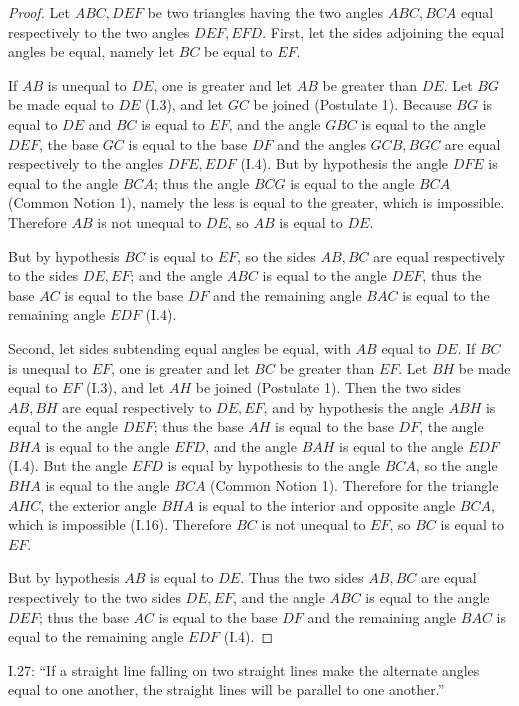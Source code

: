 \documentclass{article}
\begin{document}
\begin{proof}
Let $ABC,DEF$ be two triangles having 
the two angles $ABC,BCA$ equal respectively to the two angles
$DEF,EFD$. First, let the sides adjoining the equal angles be equal, namely
let $BC$ be equal to $EF$.

If $AB$ is unequal to $DE$, one is greater and let $AB$ be greater than $DE$.
Let $BG$ be made equal to $DE$ (I.3), and let $GC$ be joined (Postulate 1).
Because $BG$ is equal to $DE$ and $BC$ is equal to $EF$,
and the angle $GBC$ is equal to the angle $DEF$, the
base $GC$ is equal to the base $DF$ and the angles
$GCB,BGC$ are equal respectively to the angles
$DFE,EDF$ (I.4). But by hypothesis the angle $DFE$ is equal to the angle
$BCA$; thus the angle $BCG$ is equal to the angle $BCA$ (Common Notion 1),
namely the less is equal to the greater, which is impossible. Therefore
$AB$ is not unequal to $DE$, so $AB$ is equal to $DE$.

But by hypothesis $BC$ is equal to $EF$, so the sides
$AB,BC$ are equal respectively to the sides $DE,EF$; and
the angle $ABC$ is equal to the angle $DEF$, thus 
the base $AC$ is equal to the base $DF$ and the remaining angle
$BAC$ is equal to the remaining angle $EDF$ (I.4).

Second, let sides subtending equal angles be equal, with $AB$ equal to $DE$.
If $BC$ is unequal to $EF$, one is greater and let $BC$ be greater than $EF$.
Let $BH$ be made equal to $EF$ (I.3), and let $AH$ be joined (Postulate 1).
Then the two sides $AB,BH$ are equal respectively to
$DE,EF$, and by hypothesis the angle $ABH$ is equal to the angle $DEF$;
thus the base $AH$ is equal to the base $DF$, the angle
$BHA$ is equal to the angle $EFD$, and the angle $BAH$ is equal to the angle
$EDF$ (I.4).
But the angle $EFD$ is equal by hypothesis to the angle $BCA$, so the angle
$BHA$ is equal to the angle $BCA$ (Common Notion 1).
Therefore for the triangle $AHC$, the exterior angle $BHA$ is equal
to the interior and opposite angle $BCA$, which is impossible (I.16).
Therefore $BC$ is not unequal to $EF$, so $BC$ is equal to $EF$.

But by hypothesis $AB$ is equal to $DE$. Thus the two sides $AB,BC$ are equal respectively to
the two sides $DE,EF$, and the angle $ABC$ is equal to the angle $DEF$; thus
the base $AC$ is equal to the base $DF$ and the 
remaining angle $BAC$ is equal to the remaining angle $EDF$ (I.4).
\end{proof}

I.27: ``If a straight line falling on two straight lines make the
alternate angles equal to one another, the straight lines will be
parallel to one another.''
\end{document}
